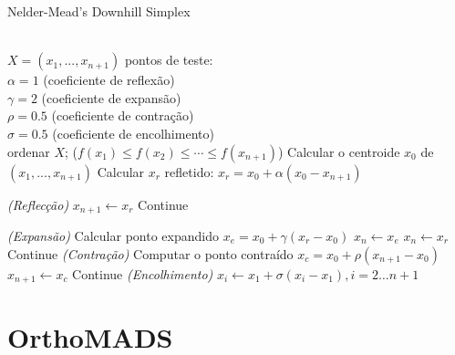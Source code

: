 \begin{algorithm}
    \caption{Nelder-Mead's Downhill Simplex}
    \label{alg:nm}
    \begin{algorithmic}[1] %
        \Require \\$X = (x_1, ... , x_{n+1})$ pontos de teste:\\
                 $\alpha=1$ (coeficiente de reflexão)\\
                 $\gamma=2$ (coeficiente de expansão)\\
                 $\rho=0.5$ (coeficiente de contração)\\
                 $\sigma=0.5$ (coeficiente de encolhimento)\\
                \State ordenar $X$; ($f(x _1) \leq f({x} _2) \leq \cdots \leq f(x_{n+1})$) 
                \State Calcular o centroide $x_0$ de $(x_{1}, ... , x_{n+1})$
                \State Calcular $x_r$ refletido: $x_r = x_0 + \alpha(x_0 - x_{n+1})$ 
                
\BState \emph{(Reflecção)}                
                    \State $x_{n+1} \gets x_r$
                    \State Continue
                \EndIf

\BState \emph{(Expansão)}
                    \State Calcular ponto expandido $x_e = x_0 + \gamma(x_r - x_0) $
                        \State $x_n \gets x_e$
                    \Else
                        \State $x_n \gets x_r$                  
                    \EndIf
                    \State Continue
                \EndIf
\BState \emph{(Contração)}
                \State Computar o ponto contraído $x_c = x_0 + \rho(x_{n+1} - x_0)$
                    \State $x_{n+1} \gets x_c$
                    \State Continue             
                \EndIf
\BState \emph{(Encolhimento)}
                \State $x_i \gets x_1 + \sigma(x_i - x_1), i=2 \dots n+1$
            \EndWhile
    \end{algorithmic}
\end{algorithm}



\section{OrthoMADS}

